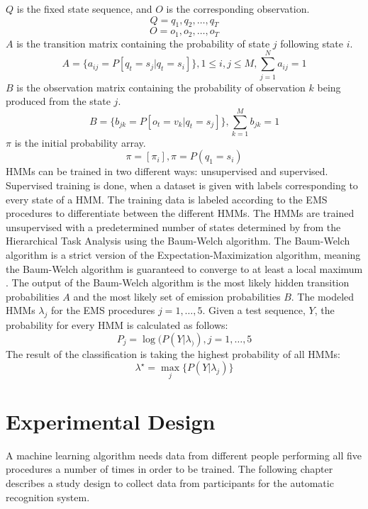 $Q$ is the fixed state sequence, and $O$ is the corresponding observation.
$$Q=q_1,q_2,\dots,q_T$$
$$O=o_1,o_2,\dots,o_T$$
$A$ is the transition matrix containing the probability of state $j$ following state $i$.
$$A = \{a_{ij} = P[q_t=s_j|q_t=s_i]\}, 1\leq i, j\leq M, \sum_{j=1}^{N}a_{ij}=1$$
$B$ is the observation matrix containing the probability of observation $k$ being produced from the state $j$.
$$B= \{b_{jk}=P[o_t=v_k|q_t=s_j]\}, \sum_{k=1}^{M}b_{jk}=1$$
$\pi$ is the initial probability array.
$$\pi=[\pi_i],\pi=P(q_1=s_i)$$
HMMs can be trained in two different ways: unsupervised and supervised. Supervised training is done, when a dataset is given with labels corresponding to every state of a HMM. The training data is labeled according to the EMS procedures to differentiate between the different HMMs. The HMMs are trained unsupervised with a predetermined number of states determined by from the Hierarchical Task Analysis using the Baum-Welch algorithm. The Baum-Welch algorithm is a strict version of the Expectation-Maximization algorithm, meaning the Baum-Welch algorithm is guaranteed to converge to at least a local maximum \cite{baum1970}. The output of the Baum-Welch algorithm is the most likely hidden transition probabilities $A$ and the most likely set of emission probabilities $B$. The modeled HMMs $\lambda_{j}$ for the EMS procedures $j=1,\dots,5$. Given a test sequence, $Y$, the probability for every HMM is calculated as follows:
$$P_j=\log(P(Y|\lambda_)), j=1,\dots,5$$
The result of the classification is taking the highest probability of all HMMs:
$$\lambda^\star=\max_{j}\{P(Y|\lambda_{j})\}$$

\section{Experimental Design}
\label{sec:Experimental-Design}
A machine learning algorithm needs data from different people performing all five procedures a number of times in order to be trained. The following chapter describes a study design to collect data from participants for the automatic recognition system. 

